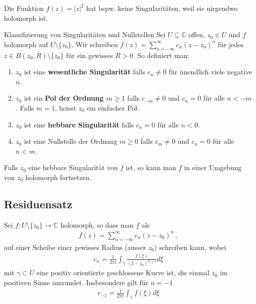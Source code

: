 \documentclass[a4paper,10pt]{article}
\begin{document}
Die Funktion $f(z) = |z|^2$ hat bspw. keine Singularitäten, weil sie nirgendwo holomorph ist.

\begin{mainbox}{Klassifizierung von Singularitäten und Nullstellen}
  Sei \(U\subseteq \mathbb{C}\) offen, \(z_0 \in U\) und \(f\) holomorph auf \(U\setminus\{z_0\}\). Wir schreiben \(f(z) = \sum_{n=-\infty}^{\infty} c_n (z-z_0)^n\) für jedes \(z\in B(z_0,R)\setminus\{z_0\}\) für ein gewisses \(R>0\). So definiert man:

  \begin{enumerate}
    \item{
      \(z_0\) ist eine \textbf{wesentliche Singularität} falls \(c_n \neq 0\) für unendlich viele negative \(n\).
    }
    \item{
      \(z_0\) ist ein \textbf{Pol der Ordnung \(m \geq 1\)} falls \(c_{-m} \neq 0\) und \(c_n =0\) für alle \(n<-m\). Falls \(m=1\), heisst \(z_0\) ein einfacher Pol.
    }
    \item{
      \(z_0\) ist eine \textbf{hebbare Singularität} falls \(c_n = 0\) für alle \(n<0\).
    }
    \item{
      \(z_0\) ist eine Nullstelle der Ordnung \(m \geq 0\) falls \(c_m \neq 0\) und \(c_n =0\) für alle \(n < m\).
    }
  \end{enumerate}
\end{mainbox}

Falls $z_0$ eine hebbare Singularität von $f$ ist, so kann man $f$ in einer Umgebung von $z_0$ holomorph fortsetzen.

\subsection{Residuensatz}

Sei \(f \colon U \setminus \{ z_0 \} \to \mathbb{C}\) holomorph, so dass man \(f\) als \begin{align*} f(z) = \sum_{n=-\infty}^{\infty} c_n (z-z_0)^n\,, \end{align*} auf einer Scheibe einer gewisses Radius (ausser \(z_0\)) schreiben kann, wobei \begin{align*} c_n = \frac{1}{2\pi i} \int_{\gamma} \frac{f(\xi)}{(\xi - z_0)^{n+1}} d\xi \end{align*} mit \(\gamma \subset U\) eine positiv orientierte geschlossene Kurve ist, die einmal \(z_0\) im positiven Sinne umrundet. Insbesondere gilt für \(n=-1\) \begin{align*}c_{-1} = \frac{1}{2\pi i} \int_{\gamma} f(\xi) d\xi \end{align*}
\end{document}
